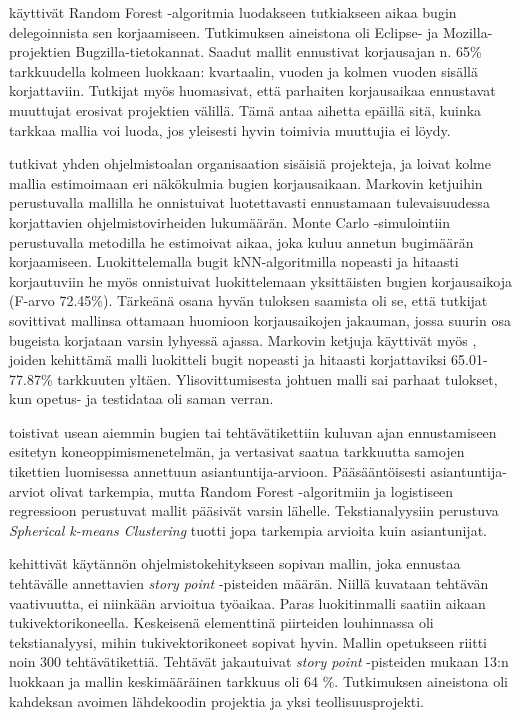 \documentclass[utf8]{gradu3}
\begin{document}
%
%

\textcite{Marks-2011} käyttivät Random Forest -algoritmia luodakseen tutkiakseen
aikaa bugin delegoinnista sen korjaamiseen. Tutkimuksen aineistona oli Eclipse-
ja Mozilla-projektien Bugzilla-tietokannat. Saadut mallit ennustivat korjausajan
n. 65\% tarkkuudella kolmeen luokkaan: kvartaalin, vuoden ja kolmen vuoden
sisällä korjattaviin. Tutkijat myös huomasivat, että parhaiten korjausaikaa
ennustavat muuttujat erosivat projektien välillä. Tämä antaa aihetta epäillä
sitä, kuinka tarkkaa mallia voi luoda, jos yleisesti hyvin toimivia muuttujia ei
löydy.

\textcite{Zhang-2013} tutkivat yhden ohjelmistoalan organisaation sisäisiä
projekteja, ja loivat kolme mallia estimoimaan eri näkökulmia bugien
korjausaikaan. Markovin ketjuihin perustuvalla mallilla he onnistuivat
luotettavasti ennustamaan tulevaisuudessa korjattavien ohjelmistovirheiden
lukumäärän. Monte Carlo -simulointiin perustuvalla metodilla he estimoivat
aikaa, joka kuluu annetun bugimäärän korjaamiseen. Luokittelemalla bugit
kNN-algoritmilla nopeasti ja hitaasti korjautuviin he myös onnistuivat
luokittelemaan yksittäisten bugien korjausaikoja (F-arvo 72.45\%). Tärkeänä
osana hyvän tuloksen saamista oli se, että tutkijat sovittivat mallinsa ottamaan
huomioon korjausaikojen jakauman, jossa suurin osa bugeista korjataan varsin
lyhyessä ajassa. Markovin ketjuja käyttivät myös \textcite{Pombo-2020}, joiden
kehittämä malli luokitteli bugit nopeasti ja hitaasti korjattaviksi
65.01-77.87\% tarkkuuten yltäen. Ylisovittumisesta johtuen malli sai parhaat
tulokset, kun opetus- ja testidataa oli saman verran.

\textcite{Pfahl-2016} toistivat usean aiemmin bugien tai tehtävätikettiin
kuluvan ajan ennustamiseen esitetyn koneoppimismenetelmän, ja vertasivat saatua
tarkkuutta samojen tikettien luomisessa annettuun asiantuntija-arvioon.
Pääsääntöisesti asiantuntija-arviot olivat tarkempia, mutta Random Forest
-algoritmiin ja logistiseen regressioon perustuvat mallit pääsivät varsin
lähelle. Tekstianalyysiin perustuva \textit{Spherical k-means Clustering} tuotti
jopa tarkempia arvioita kuin asiantunijat.

\textcite{Porru-2016} kehittivät käytännön ohjelmistokehitykseen sopivan mallin,
joka ennustaa tehtävälle annettavien \textit{story point} -pisteiden määrän.
Niillä kuvataan tehtävän vaativuutta, ei niinkään arvioitua työaikaa. Paras
luokitinmalli saatiin aikaan tukivektorikoneella. Keskeisenä elementtinä
piirteiden louhinnassa oli tekstianalyysi, mihin tukivektorikoneet sopivat
hyvin. Mallin opetukseen riitti noin 300 tehtävätikettiä. Tehtävät jakautuivat
\textit{story point} -pisteiden mukaan 13:n luokkaan ja mallin keskimääräinen
tarkkuus oli 64 \%. Tutkimuksen aineistona oli kahdeksan avoimen lähdekoodin
projektia ja yksi teollisuusprojekti.
\end{document}
